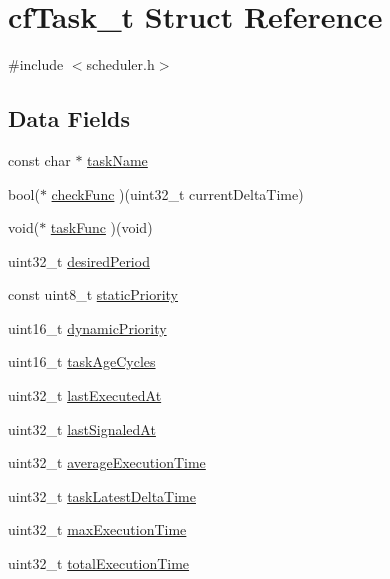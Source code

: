 \hypertarget{structcfTask__t}{\section{cf\+Task\+\_\+t Struct Reference}
\label{structcfTask__t}
}


{\ttfamily \#include $<$scheduler.\+h$>$}

\subsection*{Data Fields}
\begin{DoxyCompactItemize}
\item 
const char $\ast$ \hyperlink{structcfTask__t_a0f0e06e267cdb51eb54ef10951694a4f}{task\+Name}
\item 
bool($\ast$ \hyperlink{structcfTask__t_a7ded3bd285c19f4dcb59875fdef1c4de}{check\+Func} )(uint32\+\_\+t current\+Delta\+Time)
\item 
void($\ast$ \hyperlink{structcfTask__t_aa618965242189d51df617c44f3313815}{task\+Func} )(void)
\item 
uint32\+\_\+t \hyperlink{structcfTask__t_a2a8ae0186ff4de6c3915fff83ce88e36}{desired\+Period}
\item 
const uint8\+\_\+t \hyperlink{structcfTask__t_acf43685ea833c3add9240a08a6327644}{static\+Priority}
\item 
uint16\+\_\+t \hyperlink{structcfTask__t_a56051dcbe2e46a7551bfee039d1f36b6}{dynamic\+Priority}
\item 
uint16\+\_\+t \hyperlink{structcfTask__t_a80500af838112cbe34b6bb5f5be59119}{task\+Age\+Cycles}
\item 
uint32\+\_\+t \hyperlink{structcfTask__t_a434abf9bffed7f40d3d76ed7445d3cda}{last\+Executed\+At}
\item 
uint32\+\_\+t \hyperlink{structcfTask__t_a70f267bffa6175648d6f9ac119f8da25}{last\+Signaled\+At}
\item 
uint32\+\_\+t \hyperlink{structcfTask__t_ae73851399c3ebae6e22da3e2adc1209c}{average\+Execution\+Time}
\item 
uint32\+\_\+t \hyperlink{structcfTask__t_aa37e78e046bddb1e030d102f1d37579d}{task\+Latest\+Delta\+Time}
\item 
uint32\+\_\+t \hyperlink{structcfTask__t_a50be8f58ba00f061b78cc1bf8c1003db}{max\+Execution\+Time}
\item 
uint32\+\_\+t \hyperlink{structcfTask__t_a32d0eb0495e2b66842d3987ef382fccb}{total\+Execution\+Time}
\end{DoxyCompactItemize}


